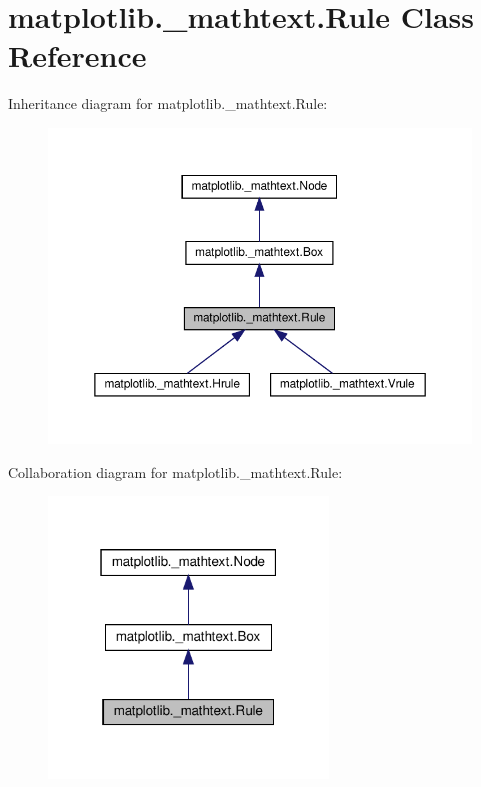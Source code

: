 \hypertarget{classmatplotlib_1_1__mathtext_1_1Rule}{}\section{matplotlib.\+\_\+mathtext.\+Rule Class Reference}
\label{classmatplotlib_1_1__mathtext_1_1Rule}


Inheritance diagram for matplotlib.\+\_\+mathtext.\+Rule\+:
\nopagebreak
\begin{figure}[H]
\begin{center}
\leavevmode
\includegraphics[width=350pt]{classmatplotlib_1_1__mathtext_1_1Rule__inherit__graph}
\end{center}
\end{figure}


Collaboration diagram for matplotlib.\+\_\+mathtext.\+Rule\+:
\nopagebreak
\begin{figure}[H]
\begin{center}
\leavevmode
\includegraphics[width=211pt]{classmatplotlib_1_1__mathtext_1_1Rule__coll__graph}
\end{center}
\end{figure}

